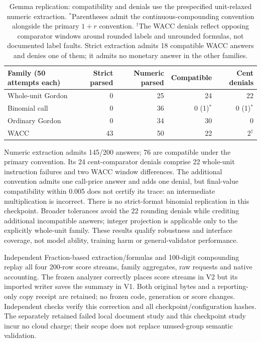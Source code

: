 \begin{table}[!ht]
\centering\small
\begin{tabular}{lrrrr}
\toprule
Family (50 attempts each) & Strict parsed & Numeric parsed & Compatible & Cent denials\\
\midrule
Whole-unit Gordon & 0 & 25 & 24 & 22\\
Binomial call & 0 & 36 & 0 (1)$^*$ & 0 (1)$^*$\\
Ordinary Gordon & 0 & 34 & 30 & 0\\
WACC & 43 & 50 & 22 & 2$^\dagger$\\
\bottomrule
\end{tabular}
\caption{Gemma replication: compatibility and denials use the prespecified unit-relaxed numeric extraction. $^*$Parentheses admit the continuous-compounding convention alongside the primary $1+r$ convention. $^\dagger$The WACC denials reflect opposing comparator windows around rounded labels and unrounded formulas, not documented label faults. Strict extraction admits 18 compatible WACC answers and denies one of them; it admits no monetary answer in the other families.}
\label{tab:gemma-replication}
\end{table}

Numeric extraction admits 145/200 answers; 76 are compatible under the primary convention. Its 24 cent-comparator denials comprise 22 whole-unit instruction failures and two WACC window differences. The additional convention admits one call-price answer and adds one denial, but final-value compatibility within 0.005 does not certify its trace: an intermediate multiplication is incorrect. There is no strict-format binomial replication in this checkpoint. Broader tolerances avoid the 22 rounding denials while crediting additional incompatible answers; integer projection is applicable only to the explicitly whole-unit family. These results qualify robustness and interface coverage, not model ability, training harm or general-validator performance.

Independent Fraction-based extraction/formulas and 100-digit compounding replay all four 200-row score streams, family aggregates, raw requests and native accounting. The frozen analyzer correctly places score streams in V2 but its imported writer saves the summary in V1. Both original bytes and a reporting-only copy receipt are retained; no frozen code, generation or score changes. Independent checks verify this correction and all checkpoint/configuration hashes. The separately retained failed local document study and this checkpoint study incur no cloud charge; their scope does not replace unused-group semantic validation.

